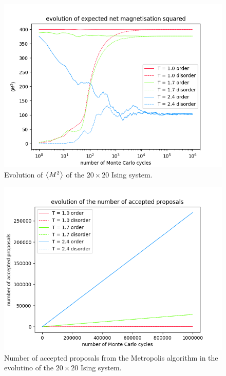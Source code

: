 \documentclass[nofootinbib,reprint,english]{revtex4-1}
\begin{document}
\begin{figure}
\centering
\includegraphics[scale=0.5]{../output/figures/experiment2/netmagnetisation2.png}
\caption{Evolution of \(\expval{M^2}\) of the \(20\times20\) Ising system.}\label{fig:experiment2_netmagnetisation2}
\end{figure}

\begin{figure}
\centering
\includegraphics[scale=0.5]{../output/figures/experiment2/accepted.png}
\caption{Number of accepted proposals from the Metropolis algorithm in the evolutino of the \(20\times20\) Ising system.}\label{fig:experiment2_accepted}
\end{figure}
\end{document}
